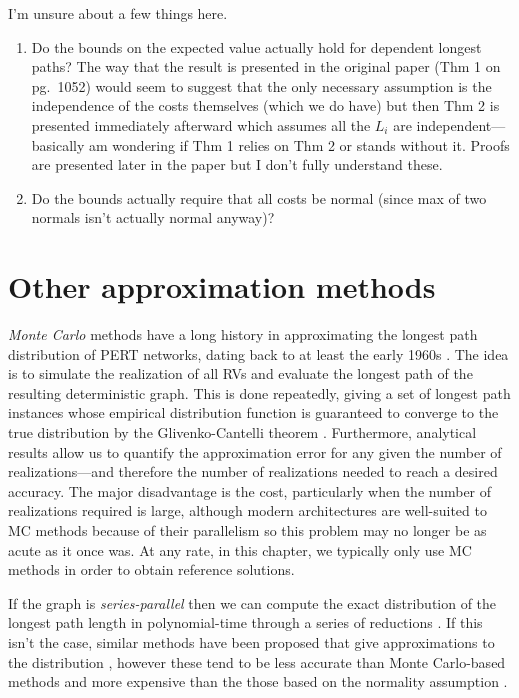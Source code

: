 \documentclass[12pt]{article}
\begin{document}
I'm unsure about a few things here. 
\begin{enumerate}
\item Do the bounds on the expected value actually hold for dependent longest paths? The way that the result is presented in the original paper (Thm 1 on pg.~1052) would seem to suggest that the only necessary assumption is the independence of the costs themselves (which we do have) but then Thm 2 is presented immediately afterward which assumes all the $L_i$ are independent---basically am wondering if Thm 1 relies on Thm 2 or stands without it. Proofs are presented later in the paper but I don't fully understand these.
  \item Do the bounds actually require that all costs be normal (since max of two normals isn't actually normal anyway)? 
  \end{enumerate}


\section{Other approximation methods}
\label{sect.other_methods} 


{\em Monte Carlo} methods have a long history in approximating the longest path distribution of PERT networks, dating back to at least the early 1960s \cite{van63}. The idea is to simulate the realization of all RVs and evaluate the longest path of the resulting deterministic graph. This is done repeatedly, giving a set of longest path instances whose empirical distribution function is guaranteed to converge to the true distribution by the Glivenko-Cantelli theorem \cite{can16}. Furthermore, analytical results allow us to quantify the approximation error for any given the number of realizations---and therefore the number of realizations needed to reach a desired accuracy. The major disadvantage is the cost, particularly when the number of realizations required is large, although modern architectures are well-suited to MC methods because of their parallelism so this problem may no longer be as acute as it once was. At any rate, in this chapter, we typically only use MC methods in order to obtain reference solutions.

If the graph is {\em series-parallel} then we can compute the exact distribution of the longest path length in polynomial-time through a series of reductions \cite{dod85,mar65}. If this isn't the case, similar methods have been proposed that give approximations to the distribution \cite{dod85,lud01}, however these tend to be less accurate than Monte Carlo-based methods and more expensive than the those based on the normality assumption \cite{can16}. 
\end{document}
